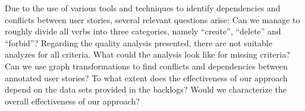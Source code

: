 Due to the use of various tools and techniques to identify dependencies and conflicts between user stories, several relevant questions arise: Can we manage to roughly divide all verbs into three categories, namely \enquote{create}, \enquote{delete} and \enquote{forbid}? Regarding the quality analysis presented, there are not suitable analyzes for all criteria. What could the analysis look like for missing criteria? Can we use graph transformations to find conflicts and dependencies between annotated user stories? To what extent does the effectiveness of our approach depend on the data sets provided in the backlogs? Would we characterize the overall effectiveness of our approach?